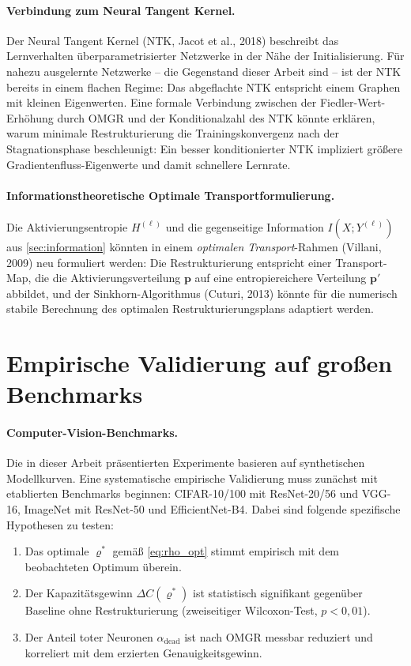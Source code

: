 \documentclass[12pt, a4paper, openany]{report}
\begin{document}
\paragraph{Verbindung zum Neural Tangent Kernel.}
Der Neural Tangent Kernel (NTK, Jacot et al., 2018) beschreibt das
Lernverhalten überparametrisierter Netzwerke in der Nähe der Initialisierung.
Für nahezu ausgelernte Netzwerke -- die Gegenstand dieser Arbeit sind --
ist der NTK bereits in einem flachen Regime: Das abgeflachte NTK
entspricht einem Graphen mit kleinen Eigenwerten.  Eine formale
Verbindung zwischen der Fiedler-Wert-Erhöhung durch OMGR und der
Konditionalzahl des NTK könnte erklären, warum minimale Restrukturierung
die Trainingskonvergenz nach der Stagnationsphase beschleunigt: Ein
besser konditionierter NTK impliziert größere Gradientenfluss-Eigenwerte
und damit schnellere Lernrate.

\paragraph{Informationstheoretische Optimale Transportformulierung.}
Die Aktivierungsentropie $H^{(\ell)}$ und die gegenseitige Information
$I(X; Y^{(\ell)})$ aus \cref{sec:information} könnten in einem
\emph{optimalen Transport}-Rahmen (Villani, 2009) neu formuliert werden:
Die Restrukturierung entspricht einer Transport-Map, die die
Aktivierungsverteilung $\bm{p}$ auf eine entropiereichere Verteilung
$\bm{p}'$ abbildet, und der Sinkhorn-Algorithmus (Cuturi, 2013) könnte
für die numerisch stabile Berechnung des optimalen Restrukturierungsplans
adaptiert werden.

\section{Empirische Validierung auf großen Benchmarks}
\label{sec:outlook_empirical}

\paragraph{Computer-Vision-Benchmarks.}
Die in dieser Arbeit präsentierten Experimente basieren auf synthetischen
Modellkurven.  Eine systematische empirische Validierung muss zunächst
mit etablierten Benchmarks beginnen: CIFAR-10/100 mit ResNet-20/56 und
VGG-16, ImageNet mit ResNet-50 und EfficientNet-B4.  Dabei sind folgende
spezifische Hypothesen zu testen:
\begin{enumerate}[label=(\roman*)]
  \item Das optimale $\varrho^*$ gemäß \eqref{eq:rho_opt} stimmt
    empirisch mit dem beobachteten Optimum überein.
  \item Der Kapazitätsgewinn $\Delta C(\varrho^*)$ ist statistisch
    signifikant gegenüber Baseline ohne Restrukturierung
    (zweiseitiger Wilcoxon-Test, $p < 0{,}01$).
  \item Der Anteil toter Neuronen $\alpha_{\mathrm{dead}}$ ist nach OMGR
    messbar reduziert und korreliert mit dem erzierten Genauigkeitsgewinn.
\end{enumerate}
\end{document}
